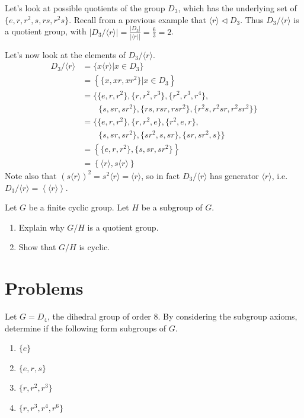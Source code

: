 \begin{example}
    Let's look at possible quotients of the group $D_3$, which has the underlying set of $\{e, r, r^2, s, rs, r^2s\}$. Recall from a previous example that $\langle r \rangle \lhd D_3$. Thus $D_3 / \langle r \rangle$ is a quotient group, with $|D_3 / \langle r \rangle| = \frac{|D_3|}{|\langle r\rangle|} = \frac63 = 2$.

    Let's now look at the elements of $D_3 / \langle r \rangle$.
    \begin{align*}
        D_3 / \langle r \rangle  &= \{x\langle r \rangle \vert x \in D_3\}\\
        &= \left\{\{x, xr, xr^2\} \vert x \in D_3\right\}\\
        &= \{\{e, r, r^2\}, \{r, r^2, r^3\}, \{r^2, r^3, r^4\}, \\ &\quad\quad \{s, sr, sr^2\}, \{rs, rsr, rsr^2\}, \{r^2s, r^2sr, r^2sr^2\}\}\\
        &= \{\{e, r, r^2\}, \{r, r^2, e\}, \{r^2, e, r\}, \\ &\quad\quad \{s, sr, sr^2\}, \{sr^2, s, sr\}, \{sr, sr^2, s\}\}\\
        &= \left\{\{e, r, r^2\}, \{s, sr, sr^2\}\right\}\\
        &= \left\{\langle r\rangle, s\langle r \rangle\right\}
    \end{align*}
    Note also that $(s\langle r \rangle)^2 = s^2\langle r \rangle = \langle r\rangle$, so in fact $D_3 / \langle r \rangle$ has generator $\langle r \rangle$, i.e. $D_3 / \langle r \rangle = \left\langle \langle r \rangle \right\rangle$.
\end{example}

\begin{exercise}\label{exercise-quotient-group-of-cyclic-group-is-cyclic}
    Let $G$ be a finite cyclic group. Let $H$ be a subgroup of $G$.
    \begin{enumerate}[label=(\roman*)]
        \item Explain why $G/H$ is a quotient group.
        \item Show that $G/H$ is cyclic.
    \end{enumerate}    
\end{exercise}

\newpage

\section{Problems}
\begin{problem}
    Let $G = D_4$, the dihedral group of order 8. By considering the subgroup axioms, determine if the following form subgroups of $G$.
    \begin{enumerate}[label=(\alph*)]
        \item $\{e\}$
        \item $\{e, r, s\}$
        \item $\{r, r^2, r^3\}$
        \item $\{r, r^3, r^4, r^6\}$
    \end{enumerate}
\end{problem}

